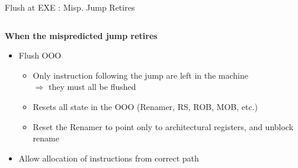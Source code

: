\documentclass[aspectratio=169,12pt]{beamer}
\begin{document}
\begin{frame}{Flush at EXE : Misp. Jump Retires}
    \centering
    
    
    \vspace{0.5cm}
    \begin{columns}[T]
        \begin{column}{0.9\textwidth}
            \textbf{When the mispredicted jump retires}
            \begin{itemize}
                \item Flush OOO
                \begin{itemize}
                    \item Only instruction following the jump are left in the machine \\
                    $\Rightarrow$ they must all be flushed
                    \item Resets all state in the OOO (Renamer, RS, ROB, MOB, etc.)
                    \item Reset the Renamer to point only to architectural registers, and unblock rename
                \end{itemize}
                \item Allow allocation of instructions from correct path
            \end{itemize}
        \end{column}
    \end{columns}
\end{frame}
\end{document}
